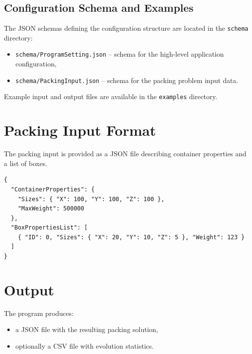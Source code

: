 \subsection{Configuration Schema and Examples}

The JSON schemas defining the configuration structure are located in the \texttt{schema} directory:

\begin{itemize}
    \item \texttt{schema/ProgramSetting.json} -- schema for the high-level application configuration,
    \item \texttt{schema/PackingInput.json} -- schema for the packing problem input data.
\end{itemize}

Example input and output files are available in the \texttt{examples} directory.

\section{Packing Input Format}

The packing input is provided as a JSON file describing container properties and a list of boxes.

\begin{verbatim}
{
  "ContainerProperties": {
    "Sizes": { "X": 100, "Y": 100, "Z": 100 },
    "MaxWeight": 500000
  },
  "BoxPropertiesList": [
    { "ID": 0, "Sizes": { "X": 20, "Y": 10, "Z": 5 }, "Weight": 123 }
  ]
}
\end{verbatim}

\section{Output}

The program produces:
\begin{itemize}
    \item a JSON file with the resulting packing solution,
    \item optionally a CSV file with evolution statistics.
\end{itemize}